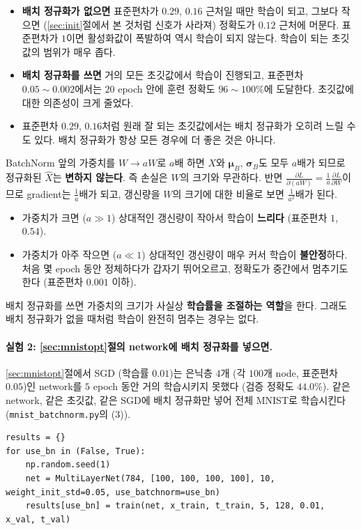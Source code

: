 \documentclass[11pt,a4paper]{article}
\newcommand{\pd}[2]{\frac{\partial #1}{\partial #2}}
\begin{document}
\begin{itemize}[leftmargin=1.8em]
\item \textbf{배치 정규화가 없으면} 표준편차가 $0.29$, $0.16$ 근처일 때만 학습이 되고,
그보다 작으면 (\ref{sec:init}절에서 본 것처럼 신호가 사라져) 정확도가 $0.12$ 근처에 머문다.
표준편차가 $1$이면 활성화값이 폭발하여 역시 학습이 되지 않는다.
학습이 되는 초깃값의 범위가 매우 좁다.
\item \textbf{배치 정규화를 쓰면} 거의 모든 초깃값에서 학습이 진행되고,
표준편차 $0.05\sim0.002$에서는 $20$ epoch 안에 훈련 정확도 $96\sim100\%$에 도달한다.
초깃값에 대한 의존성이 크게 줄었다.
\item 표준편차 $0.29$, $0.16$처럼 원래 잘 되는 초깃값에서는 배치 정규화가 오히려 느릴 수도 있다.
배치 정규화가 항상 모든 경우에 더 좋은 것은 아니다.
\end{itemize}

\begin{thinkbox}
BatchNorm 앞의 가중치를 $W\to aW$로 $a$배 하면 $X$와 $\bm\mu_B$, $\bm\sigma_B$도 모두 $a$배가 되므로
정규화된 $\hat X$는 \textbf{변하지 않는다}. 즉 손실은 $W$의 크기와 무관하다.
반면 $\pd{L}{(aW)}=\frac1a\pd{L}{W}$이므로 gradient는 $\frac1a$배가 되고,
갱신량을 $W$의 크기에 대한 비율로 보면 $\frac{1}{a^2}$배가 된다.
\begin{itemize}[leftmargin=1.5em]
\item 가중치가 크면 ($a\gg1$) 상대적인 갱신량이 작아서 학습이 \textbf{느리다}
(표준편차 $1$, $0.54$).
\item 가중치가 아주 작으면 ($a\ll1$) 상대적인 갱신량이 매우 커서 학습이 \textbf{불안정}하다.
처음 몇 epoch 동안 정체하다가 갑자기 뛰어오르고, 정확도가 중간에서 멈추기도 한다
(표준편차 $0.001$ 이하).
\end{itemize}
배치 정규화를 쓰면 가중치의 크기가 사실상 \textbf{학습률을 조절하는 역할}을 한다.
그래도 배치 정규화가 없을 때처럼 학습이 완전히 멈추는 경우는 없다.
\end{thinkbox}

\paragraph{실험 2: \ref{sec:mnistopt}절의 network에 배치 정규화를 넣으면.}
\ref{sec:mnistopt}절에서 SGD (학습률 $0.01$)는 은닉층 $4$개 (각 $100$개 node, 표준편차 $0.05$)인 network를
$5$ epoch 동안 거의 학습시키지 못했다 (검증 정확도 $44.0\%$).
같은 network, 같은 초깃값, 같은 SGD에 배치 정규화만 넣어 전체 MNIST로 학습시킨다
(\texttt{mnist\_batchnorm.py}의 (3)).
\begin{lstlisting}
results = {}
for use_bn in (False, True):
    np.random.seed(1)
    net = MultiLayerNet(784, [100, 100, 100, 100], 10, weight_init_std=0.05, use_batchnorm=use_bn)
    results[use_bn] = train(net, x_train, t_train, 5, 128, 0.01, x_val, t_val)
\end{lstlisting}
\end{document}
